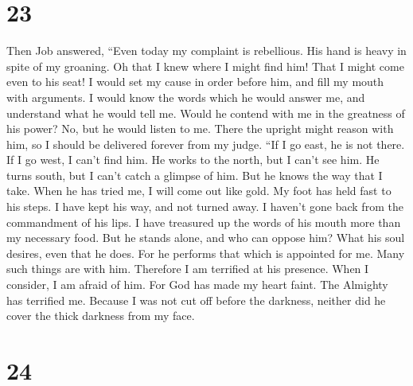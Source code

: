 \hypertarget{section-22}{%
\section{23}\label{section-22}}

 Then Job answered,  ``Even today my
complaint is rebellious. His hand is heavy in spite of my groaning.
 Oh that I knew where I might find him! That I might come
even to his seat!  I would set my cause in order before
him, and fill my mouth with arguments.  I would know the
words which he would answer me, and understand what he would tell me.
 Would he contend with me in the greatness of his power?
No, but he would listen to me.  There the upright might
reason with him, so I should be delivered forever from my judge.
 ``If I go east, he is not there. If I go west, I can't
find him.  He works to the north, but I can't see him. He
turns south, but I can't catch a glimpse of him.  But he
knows the way that I take. When he has tried me, I will come out like
gold.  My foot has held fast to his steps. I have kept
his way, and not turned away.  I haven't gone back from
the commandment of his lips. I have treasured up the words of his mouth
more than my necessary food.  But he stands alone, and
who can oppose him? What his soul desires, even that he does.
 For he performs that which is appointed for me. Many
such things are with him.  Therefore I am terrified at
his presence. When I consider, I am afraid of him.  For
God has made my heart faint. The Almighty has terrified me.
 Because I was not cut off before the darkness, neither
did he cover the thick darkness from my face.

\hypertarget{section-23}{%
\section{24}\label{section-23}}


